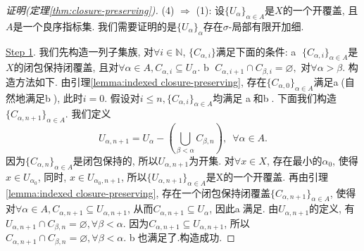 \documentclass[a4paper,UTF8]{ctexart}
\begin{document}
\begin{proof}[证明(定理\ref{thm:closure-preserving})]
  (4) $\Rightarrow$ (1): 设$\{ U_{\alpha} \}_{\alpha \in A}$是$X$的一个开覆盖, 且$A$是一个良序指标集.
  我们需要证明的是$\{ U_{\alpha} \}_{\alpha}$存在$\sigma$-局部有限开加细.
  
  \underline{Step 1}.
  我们先构造一列子集族, 对$\forall i \in \mathbb{N}$,
  $\{ C_{\alpha, i} \}$满足下面的条件: \newline
  \textcircled{a}
    $\{ C_{\alpha, i} \}_{\alpha \in A}$是$X$的闭包保持闭覆盖,
    且对$\forall \alpha \in A, C_{\alpha, i} \subseteq U_{\alpha}$.\newline
  \textcircled{b}
    $C_{\alpha, i+1} \cap C_{\beta, i} = \varnothing,$ 对$\forall \alpha > \beta$.\newline
  构造方法如下. 由引理\ref{lemma:indexed closure-preserving},
  存在$\{ C_{\alpha, 0} \}_{\alpha \in A}$满足\textcircled{a}(自然地满足\textcircled{b}),
  此时$i = 0$. 假设对$i \leq n, \{ C_{\alpha, i} \}_{\alpha \in A}$均满足
  \textcircled{a}和\textcircled{b}. 下面我们构造$\{ C_{\alpha, n+1} \}_{\alpha \in A}$.
  我们定义
  \[
    U_{\alpha, n+1} = U_\alpha - ( \bigcup_{\beta < \alpha} C_{\beta, n} ),\,\,\,\forall \alpha \in A.
  \]
  因为$\{ C_{\alpha, n} \}_{\alpha \in A}$是闭包保持的, 所以$U_{\alpha, n+1}$为开集.
  对$\forall x \in X$, 存在最小的$\alpha_0$, 使得$x \in U_{\alpha_0}$,
  同时, $x \in U_{\alpha_0, n+1}$, 所以$\{ U_{\alpha, n+1} \}_{\alpha \in A}$是X的一个开覆盖.
  再由引理\ref{lemma:indexed closure-preserving},
  存在一个闭包保持闭覆盖$\{ C_{\alpha, n+1} \}_{\alpha \in A}$,
  使得对$\forall \alpha \in A, C_{\alpha, n+1} \subseteq U_{\alpha, n+1}$,
  从而$C_{\alpha, n+1} \subseteq U_{\alpha}$, 因此\textcircled{a}满足.
  由$U_{\alpha, n+1}$的定义,
  有$U_{\alpha, n+1} \cap C_{\beta, n} = \varnothing, \forall \beta < \alpha$.
  因为$C_{\alpha, n+1} \subseteq U_{\alpha, n+1}$, 
  所以$C_{\alpha, n+1} \cap C_{\beta, n} = \varnothing, \forall \beta < \alpha$.
  \textcircled{b}也满足了.构造成功.


\end{proof}
\end{document}
